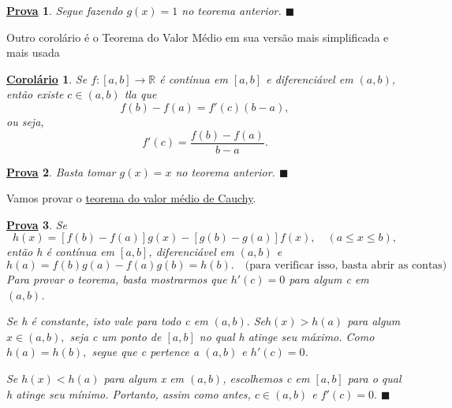 \documentclass{article}
\newtheorem*{proof*}{\underline{Prova}}
\newtheorem*{crl*}{\underline{Corol\'ario}}
\renewcommand\qedsymbol{$\blacksquare$}
\begin{document}
\begin{proof*}
  Segue fazendo \(g(x) = 1\) no teorema anterior. \qedsymbol
\end{proof*}
 Outro corolário é o Teorema do Valor Médio em sua versão mais simplificada e mais usada
 \hypertarget{mean_value}{
\begin{crl*}
  Se \(f:[a, b]\rightarrow \mathbb{R}\) é contínua em \([a, b]\) e diferenciável em
  \((a, b)\), então existe \(c\in (a, b)\) tla que 
    \[
      f(b) - f(a) = f'(c)(b-a),
    \]
    ou seja, 
      \[
        f'(c) = \frac{f(b)-f(a)}{b-a}.
      \]
\end{crl*}}
\begin{proof*}
  Basta tomar \(g(x) = x\) no teorema anterior. \qedsymbol
\end{proof*}
  Vamos provar o \hyperlink{cauchy_mvt}{teorema do valor médio de Cauchy}.
 \begin{proof*}
   Se 
     \[
       h(x) = [f(b)-f(a)]g(x) - [g(b)-g(a)]f(x),\quad (a\leq x\leq b),
     \]
  então h é contínua em \([a, b]\), diferenciável em \((a, b)\) e 
    \[
      h(a) = f(b)g(a) - f(a)g(b) = h(b).\quad \text{(para verificar isso, basta abrir as contas)}
    \] 
  Para provar o teorema, basta mostrarmos que \(h'(c) = 0\) para algum c em \((a, b)\).

Se h é constante, isto vale para todo c em \((a, b).\) 
Se\(h(x) > h(a)\) para algum \( x\in (a, b),\) seja c um ponto de \([a, b]\) 
no qual h atinge seu máximo. Como \(h(a) = h(b),\) segue que c pertence a \((a, b)\) e \(h'(c) = 0\).

Se \(h(x) < h(a)\) para algum x em \((a, b)\), escolhemos c em \([a, b]\)
para o qual h atinge seu mínimo. Portanto, assim como antes, \(c\in (a, b)\) e
 \(f'(c) = 0.\) \qedsymbol
 \end{proof*}
\end{document}
